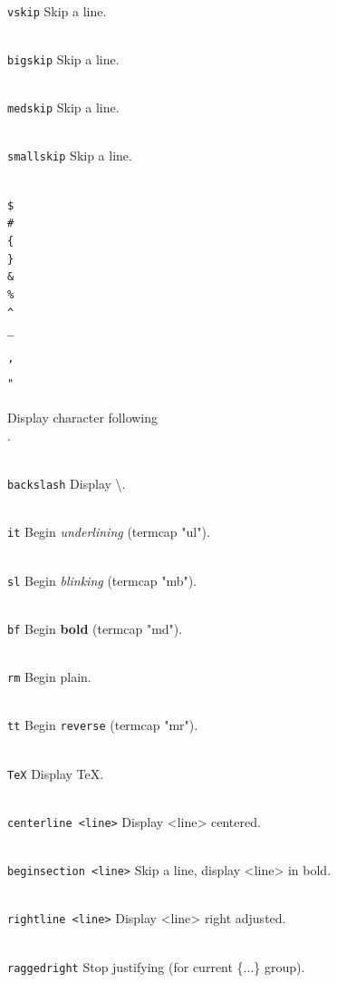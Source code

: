 \item{\tt \\vskip}	Skip a line.
\item{\tt \\bigskip}	Skip a line.
\item{\tt \\medskip}	Skip a line.
\item{\tt \\smallskip}	Skip a line.
\item{\tt \\\$ \\\# \\\{ \\\} \\\& \\\% \\^ \\_ \\\~ \\' \\" \\\\}
			Display character following \\.
\item{\tt\\backslash}	Display \backslash.
\item{\tt \\it}		Begin {\it underlining} (termcap "ul").
\item{\tt \\sl}		Begin {\sl blinking} (termcap "mb").
\item{\tt \\bf}		Begin {\bf bold} (termcap "md").
\item{\tt \\rm}		Begin plain.
\item{\tt \\tt}		Begin {\tt reverse} (termcap "mr").
\item{\tt \\TeX}	Display \TeX.
\item{\tt \\centerline~<line>}
			Display <line> centered.
\item{\tt\\beginsection~<line>}
			Skip a line, display <line> in bold.
\item{\tt \\rightline~<line>}
			Display <line> right adjusted.
\item{\tt \\raggedright}
			Stop justifying (for current \{...\} group).
